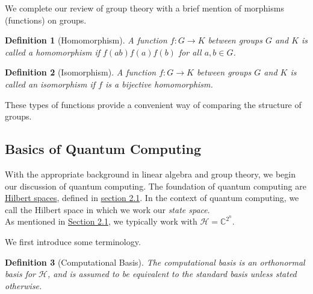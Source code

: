 \documentclass{article}
\theoremstyle{plain}
\theoremstyle{centered}
\newtheorem{definition}{Definition}
\newcommand{\camelia}{{\color{red}comment: }}
\newcommand{\bb}[1]{\mathbb{#1}}
\renewcommand{\cal}[1]{\mathcal{#1}}
\begin{document}

        We complete our review of group theory with a brief mention of morphisms (functions) on groups.


        
        \begin{definition}[Homomorphism]\label{def:homomorphism}
                A function $f: G \to K$ between groups $G$ and $K$ is called a \textit{homomorphism} if $f(ab) f(a)f(b)$ for all $a, b \in G$.
        \end{definition}

        \begin{definition}[Isomorphism]\label{def:isomorphism}
                A function $f: G \to K$ between groups $G$ and $K$ is called an \textit{isomorphism} if $f$ is a bijective homomorphism.
        \end{definition}

        These types of functions provide a convenient way of comparing the structure of groups.
        
    \subsection{Basics of Quantum Computing}\label{history:quantum_computing}
        With the appropriate background in linear algebra and group theory, we begin our discussion of quantum computing.
        The foundation of quantum computing are \hyperref[def:hilbert_space]{Hilbert spaces}, defined in \hyperref[history:linear_algebra]{section 2.1}.
        In the context of quantum computing, we call the Hilbert space in which we work our \textit{state space}.\\
        As mentioned in \hyperref[history:linear_algebra]{Section 2.1}, we typically work with $\cal{H} = \bb{C}^{2^n}$.

    
        We first introduce some terminology.
        \begin{definition}[Computational Basis]\label{def:computational_basis}
            The \textit{computational basis} is an orthonormal basis for $\cal{H}$, and is assumed to be equivalent to the standard basis unless stated otherwise.
        \end{definition}
\end{document}
